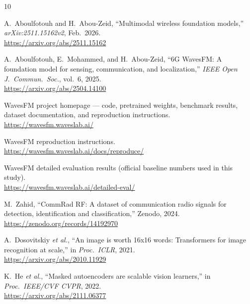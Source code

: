 \documentclass[11pt]{article}
\begin{document}
\begin{thebibliography}{10}

A.~Aboulfotouh and H.~Abou-Zeid, ``Multimodal wireless foundation models,'' \textit{arXiv:2511.15162v2}, Feb.\ 2026.\\
\url{https://arxiv.org/abs/2511.15162}

A.~Aboulfotouh, E.~Mohammed, and H.~Abou-Zeid, ``6G WavesFM: A foundation model for sensing, communication, and localization,'' \textit{IEEE Open J.\ Commun.\ Soc.}, vol.~6, 2025.\\
\url{https://arxiv.org/abs/2504.14100}

WavesFM project homepage --- code, pretrained weights, benchmark results, dataset documentation, and reproduction instructions.\\
\url{https://wavesfm.waveslab.ai/}

WavesFM reproduction instructions.\\
\url{https://wavesfm.waveslab.ai/docs/reproduce/}

WavesFM detailed evaluation results (official baseline numbers used in this study).\\
\url{https://wavesfm.waveslab.ai/detailed-eval/}

M.~Zahid, ``CommRad RF: A dataset of communication radio signals for detection, identification and classification,'' Zenodo, 2024.\\
\url{https://zenodo.org/records/14192970}

A.~Dosovitskiy \textit{et al.}, ``An image is worth 16x16 words: Transformers for image recognition at scale,'' in \textit{Proc.\ ICLR}, 2021.\\
\url{https://arxiv.org/abs/2010.11929}

K.~He \textit{et al.}, ``Masked autoencoders are scalable vision learners,'' in \textit{Proc.\ IEEE/CVF CVPR}, 2022.\\
\url{https://arxiv.org/abs/2111.06377}

\end{thebibliography}


\newpage
\appendix
\end{document}

